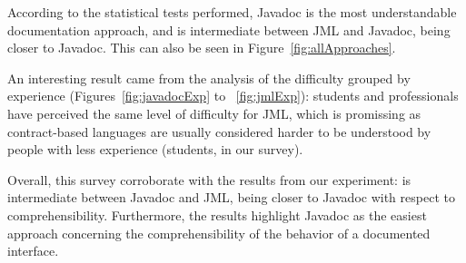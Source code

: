 According to the statistical tests performed, Javadoc is the most
understandable documentation approach, and \contractjdoc{} is intermediate between JML and
Javadoc, being closer to Javadoc.
This can also be seen in Figure~\ref{fig:allApproaches}.

An interesting result came from the analysis of the difficulty grouped by
experience (Figures~\ref{fig:javadocExp} to ~\ref{fig:jmlExp}): students and
professionals have perceived the same level of difficulty for JML, which is
promissing as contract-based languages are usually considered harder to be
understood by people with less experience (students, in our survey).

Overall, this survey corroborate with the results from our experiment: \contractjdoc{} is
intermediate between Javadoc and JML, being closer to Javadoc with respect to
comprehensibility.
Furthermore, the results highlight Javadoc as the easiest approach concerning the comprehensibility of
the behavior of a documented interface.
